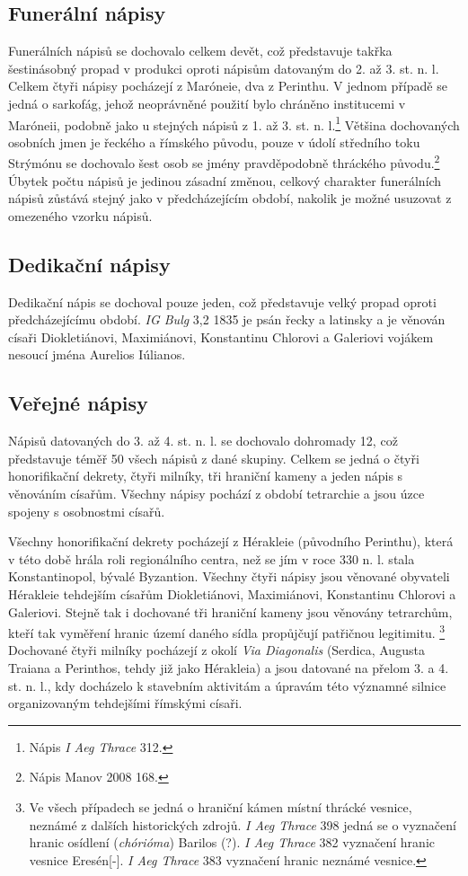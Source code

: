 \subsection[funerální-nápisy-16]{Funerální nápisy}

Funerálních nápisů se dochovalo celkem devět, což představuje takřka šestinásobný propad v produkci oproti nápisům datovaným do 2. až 3. st. n. l. Celkem čtyři nápisy pocházejí z Maróneie, dva z Perinthu. V jednom případě se jedná o sarkofág, jehož neoprávněné použití bylo chráněno institucemi v Maróneii, podobně jako u stejných nápisů z 1. až 3. st. n. l.\footnote{Nápis {\em I Aeg Thrace} 312.} Většina dochovaných osobních jmen je řeckého a římského původu, pouze v údolí středního toku Strýmónu se dochovalo šest osob se jmény pravděpodobně thráckého původu.\footnote{Nápis Manov 2008 168.} Úbytek počtu nápisů je jedinou zásadní změnou, celkový charakter funerálních nápisů zůstává stejný jako v předcházejícím období, nakolik je možné usuzovat z omezeného vzorku nápisů.

\subsection[dedikační-nápisy-16]{Dedikační nápisy}

Dedikační nápis se dochoval pouze jeden, což představuje velký propad oproti předcházejícímu období. {\em IG Bulg} 3,2 1835 je psán řecky a latinsky a je věnován císaři Diokletiánovi, Maximiánovi, Konstantinu Chlorovi a Galeriovi vojákem nesoucí jména Aurelios Iúlianos.

\subsection[veřejné-nápisy-16]{Veřejné nápisy}

Nápisů datovaných do 3. až 4. st. n. l. se dochovalo dohromady 12, což představuje téměř 50  všech nápisů z dané skupiny. Celkem se jedná o čtyři honorifikační dekrety, čtyři milníky, tři hraniční kameny a jeden nápis s věnováním císařům. Všechny nápisy pochází z období tetrarchie a jsou úzce spojeny s osobnostmi císařů.

Všechny honorifikační dekrety pocházejí z Hérakleie (původního Perinthu), která v této době hrála roli regionálního centra, než se jím v roce 330 n. l. stala Konstantinopol, bývalé Byzantion. Všechny čtyři nápisy jsou věnované obyvateli Hérakleie tehdejším císařům Diokletiánovi, Maximiánovi, Konstantinu Chlorovi a Galeriovi. Stejně tak i dochované tři hraniční kameny jsou věnovány tetrarchům, kteří tak vyměření hranic území daného sídla propůjčují patřičnou legitimitu. \footnote{Ve všech případech se jedná o hraniční kámen místní thrácké vesnice, neznámé z dalších historických zdrojů. {\em I Aeg Thrace} 398 jedná se o vyznačení hranic osídlení ({\em chórióma}) Barilos (?). {\em I Aeg Thrace} 382 vyznačení hranic vesnice Eresén{[}-{]}. {\em I Aeg Thrace} 383 vyznačení hranic neznámé vesnice.} Dochované čtyři milníky pocházejí z okolí {\em Via Diagonalis} (Serdica, Augusta Traiana a Perinthos, tehdy již jako Hérakleia) a jsou datované na přelom 3. a 4. st. n. l., kdy docházelo k stavebním aktivitám a úpravám této významné silnice organizovaným tehdejšími římskými císaři.

